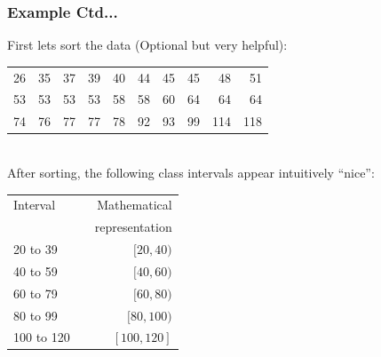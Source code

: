\documentclass[xcolor=svgnames, compress]{beamer}
\begin{document}
\begin{frame} [t]
\frametitle{Example Ctd...}

First lets sort the data (Optional but very helpful):
\hfill\\

\begin{center}
\begin{tabular}{r r r r r r r r r r  }
26	&	35	&	37	&	39	&	40	&	44	&	45	&	45	&	48	&	51	\\
53	&	53	&	53	&	53	&	58	&	58	&	60	&	64	&	64	&	64	\\
74  	&	76	&	77	&	77	&	78	&	92	&	93	&	99	&	114	&	118	\\
\end{tabular}
\end{center}
\hfill\\
After sorting, the following class intervals appear \alert{intuitively ``nice''}: 
\hfill\\

\begin{center}
\begin{tabular}{l c r}
Interval	& &	Mathematical	\\
		& &	representation	\\
\hline
20 to 39		& &	$[20,40)$	\\
40 to 59		& &	$[40,60)$ 	\\
60 to 79		& &	$[60,80)$	\\
80 to 99		& &	$[80,100)$	\\
100 to 120	& &	$[100,120]$ 	\\
\hline
\end{tabular}
\end{center}

\end{frame}
\end{document}
